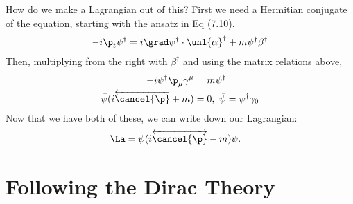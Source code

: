 \documentclass[a4paper, 11pt, normalem]{report}
\begin{document}
How do we make a Lagrangian out of this?
First we need a Hermitian conjugate of the equation, starting with the ansatz in Eq (7.10).
\begin{align}
    -i\p_t\psi^\dagger &= i\grad\psi^\dagger\cdot\unl{\alpha}^\dagger + m\psi^\dagger\beta^\dagger\\
\end{align}
Then, multiplying from the right with $\beta^\dagger$ and using the matrix relations above,
\begin{align}
    -i\psi^\dagger\p_\mu\gamma^\mu &= m\psi^\dagger \\
    \bar{\psi}(i\overleftarrow{\cancel{\p}}+m) &= 0,~ \bar{\psi} = \psi^\dagger\gamma_0
\end{align}
Now that we have both of these, we can write down our Lagrangian:
\begin{align}
    \La &= \bar{\psi}(i\overleftrightarrow{\cancel{\p}}-m)\psi.
\end{align}

\chapter{Following the Dirac Theory}
\end{document}
